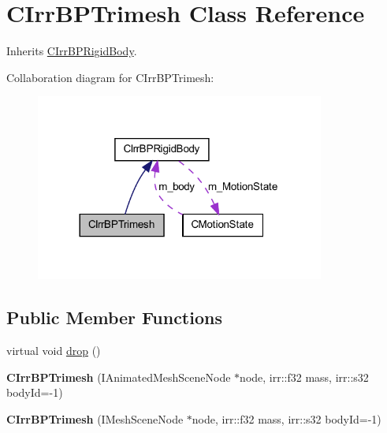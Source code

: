 \hypertarget{class_c_irr_b_p_trimesh}{
\section{CIrrBPTrimesh Class Reference}
\label{class_c_irr_b_p_trimesh}
}


Inherits \hyperlink{class_c_irr_b_p_rigid_body}{CIrrBPRigidBody}.



Collaboration diagram for CIrrBPTrimesh:\nopagebreak
\begin{figure}[H]
\begin{center}
\leavevmode
\includegraphics[width=269pt]{class_c_irr_b_p_trimesh__coll__graph}
\end{center}
\end{figure}
\subsection*{Public Member Functions}
\begin{DoxyCompactItemize}
\item 
virtual void \hyperlink{class_c_irr_b_p_trimesh_a5106e0daefa0a7dd6198311390711255}{drop} ()
\item 
\hypertarget{class_c_irr_b_p_trimesh_adcc11a8bcf9461ff7cc44092bbe56c09}{
{\bfseries CIrrBPTrimesh} (IAnimatedMeshSceneNode $\ast$node, irr::f32 mass, irr::s32 bodyId=-\/1)}
\label{class_c_irr_b_p_trimesh_adcc11a8bcf9461ff7cc44092bbe56c09}

\item 
\hypertarget{class_c_irr_b_p_trimesh_a8f8683ddff5e11df3c40b746a14cf193}{
{\bfseries CIrrBPTrimesh} (IMeshSceneNode $\ast$node, irr::f32 mass, irr::s32 bodyId=-\/1)}
\label{class_c_irr_b_p_trimesh_a8f8683ddff5e11df3c40b746a14cf193}

\end{DoxyCompactItemize}


